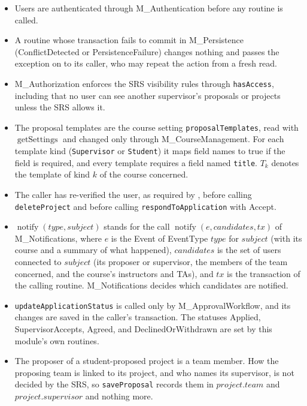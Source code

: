 \documentclass[12pt, titlepage]{article}
\newcommand{\descriptiveid}[1]{\texttt{\detokenize{#1}}}
\newcommand{\srsurl}{https://ayushpatel2026.github.io/Keystone/SRS/SRS.pdf}
\newcommand{\srsref}[1]{\href{\srsurl\#nameddest=#1}{\descriptiveid{#1}}}
\begin{document}
\begin{itemize}
    \item Users are authenticated through M\_Authentication before any routine is called.
    \item A routine whose transaction fails to commit in M\_Persistence (ConflictDetected or PersistenceFailure) changes nothing and passes the exception on to its caller, who may repeat the action from a fresh read.
    \item M\_Authorization enforces the SRS visibility rules through \texttt{hasAccess}, including that no user can see another supervisor's proposals or projects unless the SRS allows it.
    \item The proposal templates are the course setting \texttt{proposalTemplates}, read with $\operatorname{getSettings}$ and changed only through M\_CourseManagement. For each template kind (\texttt{Supervisor} or \texttt{Student}) it maps field names to true if the field is required, and every template requires a field named \texttt{title}. $T_k$ denotes the template of kind $k$ of the course concerned.
    \item The caller has re-verified the user, as required by \srsref{FR_ReverifyUsers}, before calling \texttt{deleteProject} and before calling \texttt{respondToApplication} with Accept.
    \item $\operatorname{notify}(type,subject)$ stands for the call $\operatorname{notify}(e,\mathit{candidates},tx)$ of M\_Notifications, where $e$ is the Event of EventType $type$ for $subject$ (with its course and a summary of what happened), $\mathit{candidates}$ is the set of users connected to $subject$ (its proposer or supervisor, the members of the team concerned, and the course's instructors and TAs), and $tx$ is the transaction of the calling routine. M\_Notifications decides which candidates are notified.
    \item \texttt{updateApplicationStatus} is called only by M\_ApprovalWorkflow, and its changes are saved in the caller's transaction. The statuses Applied, SupervisorAccepts, Agreed, and DeclinedOrWithdrawn are set by this module's own routines.
    \item The proposer of a student-proposed project is a team member. How the proposing team is linked to its project, and who names its supervisor, is not decided by the SRS, so \texttt{saveProposal} records them in $\mathit{project}.team$ and $\mathit{project}.supervisor$ and nothing more.
\end{itemize}
\end{document}
